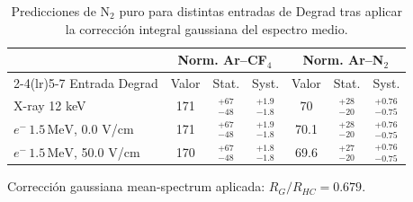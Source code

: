 \begin{table}[htbp]
\centering
\caption{Predicciones de N$_2$ puro para distintas entradas de Degrad tras aplicar la corrección integral gaussiana del espectro medio.}
\label{tab:n2_pure_predictions_gaussian_mean_spectrum}
\begin{tabular}{lcccccc}
\toprule
 & \multicolumn{3}{c}{Norm. Ar--CF$_4$} & \multicolumn{3}{c}{Norm. Ar--N$_2$} \\
\cmidrule(lr){2-4}\cmidrule(lr){5-7}
Entrada Degrad & Valor & Stat. & Syst. & Valor & Stat. & Syst. \\
\midrule
X-ray 12 keV & \num{171} & $^{+\num{67}}_{-\num{48}}$ & $^{+\num{1.9}}_{-\num{1.8}}$ & \num{70} & $^{+\num{28}}_{-\num{20}}$ & $^{+\num{0.76}}_{-\num{0.75}}$ \\
$e^-\,1.5\,\mathrm{MeV}$, 0.0 V/cm & \num{171} & $^{+\num{67}}_{-\num{48}}$ & $^{+\num{1.9}}_{-\num{1.8}}$ & \num{70.1} & $^{+\num{28}}_{-\num{20}}$ & $^{+\num{0.76}}_{-\num{0.75}}$ \\
$e^-\,1.5\,\mathrm{MeV}$, 50.0 V/cm & \num{170} & $^{+\num{67}}_{-\num{48}}$ & $^{+\num{1.8}}_{-\num{1.8}}$ & \num{69.6} & $^{+\num{27}}_{-\num{20}}$ & $^{+\num{0.76}}_{-\num{0.75}}$ \\
\bottomrule
\end{tabular}
\par\vspace{0.35em}\footnotesize{Corrección gaussiana mean-spectrum aplicada: $R_G/R_{HC}=\num{0.679}$.}
\end{table}
